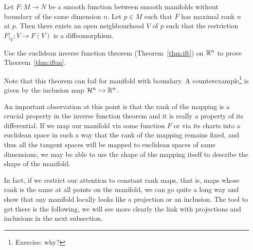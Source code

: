 \begin{theorem}\label{thm:iftm}
  Let $F:M\to N$ be a smooth function between smooth manifolds without boundary of the same dimension $n$.
  Let $p\in M$ such that $F$ has maximal rank $n$ at $p$.
  Then there exists an open neighbourhood $V$ of $p$ such that the restriction $F|_V : V\to F(V)$ is a diffeomorphism.
\end{theorem}
\begin{exercise}
  Use the euclidean inverse function theorem (Theorem~\ref{thm:ift}) on $\mathbb{R}^n$ to prove Theorem~\ref{thm:iftm}.
\end{exercise}

Note that this theorem can fail for manifold with boundary.
A counterexample\footnote{Exercise: why?} is given by the inclusion map $\mathcal{H}^n \hookrightarrow \mathbb{R}^n$.

An important observation at this point is that the rank of the mapping
is a crucial property in the inverse function theorem and it is really a
property of its differential.
If we map our manifold via some function $F$ or via its charts into a
euclidean space in such a way that the rank of the mapping remains fixed,
and thus all the tangent spaces will be mapped to euclidean spaces of same dimensions,
we may be able to use the shape of the mapping itself to describe the
shape of the manifold.

In fact, if we restrict our attention to constant rank maps, that is,
maps whose rank is the same at all points on the manifold, we can go quite a
long way and show that any manifold locally looks like a projection or an inclusion.
The tool to get there is the following, we will see more clearly the link with
projections and inclusions in the next subsection.

